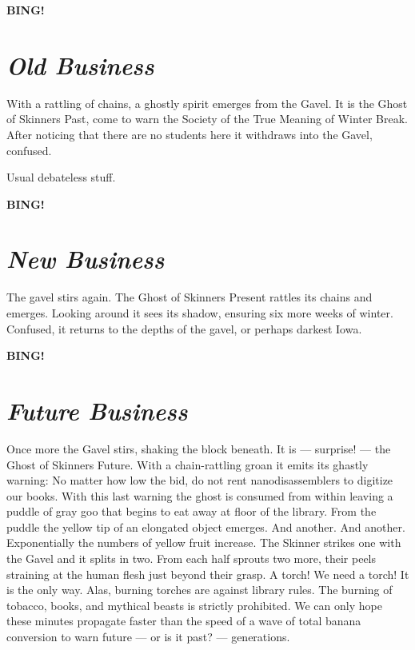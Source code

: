 \documentclass[10pt]{article}
\newcommand{\bing}{{\bf BING!} }
\newcommand{\goto}[1]{\bing \vskip 12pt \section*{{\em{#1}}}}
\begin{document}







\goto{Old Business}

With a rattling of chains, a ghostly spirit emerges from the Gavel.
It is the Ghost of Skinners Past, come to warn the Society of the
True Meaning of Winter Break.  After noticing that there are no
students here it withdraws into the Gavel, confused.

Usual debateless stuff.

\goto{New Business}

The gavel stirs again.  The Ghost of Skinners Present rattles its chains
and emerges.  Looking around it sees its shadow, ensuring six more weeks
of winter.  Confused, it returns to the depths of the gavel, or perhaps
darkest Iowa.

\goto{Future Business}

Once more the Gavel stirs, shaking the block beneath.  It is --- surprise! ---
the Ghost of Skinners Future.  With a chain-rattling groan it emits its
ghastly warning: No matter how low the bid, do not rent nanodisassemblers
to digitize our books.  With this last warning the ghost is consumed from
within leaving a puddle of gray goo that begins to eat away at floor of
the library.  From the puddle the yellow tip of an elongated object emerges.
And another.  And another.  Exponentially the numbers of yellow fruit increase.
The Skinner strikes one with the Gavel and it splits in two.  From each half
sprouts two more, their peels straining at the human flesh just beyond their
grasp.  A torch!  We need a torch!  It is the only way.  Alas, burning torches
are against library rules.  The burning of tobacco, books, and mythical beasts
is strictly prohibited.  We can only hope these minutes propagate faster than
the speed of a wave of total banana conversion to warn future --- or is it
past? --- generations.
\end{document}
